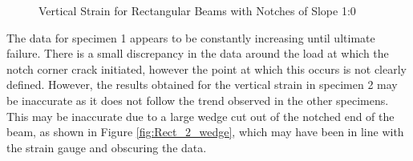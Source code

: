 \documentclass[11pt,a4paper]{article}
\numberwithin{equation}{subsection}
\begin{document}
\begin{figure}[h]
	\begin{center}
	\end{center}
	\caption{Vertical Strain for Rectangular Beams with Notches of Slope 1:0}
	\label{fig:Rect_10_Y}
\end{figure}
\pagebreak

\noindent
The data for specimen 1 appears to be constantly increasing until ultimate failure. There is a small discrepancy in the data around the load at which the notch corner crack initiated, however the point at which this occurs is not clearly defined. However, the results obtained for the vertical strain in specimen 2 may be inaccurate as it does not follow the trend observed in the other specimens. This may be inaccurate due to a large wedge cut out of the notched end of the beam, as shown in Figure \ref{fig:Rect_2_wedge}, which may have been in line with the strain gauge and obscuring the data. 
\vspace*{\baselineskip}
\end{document}
